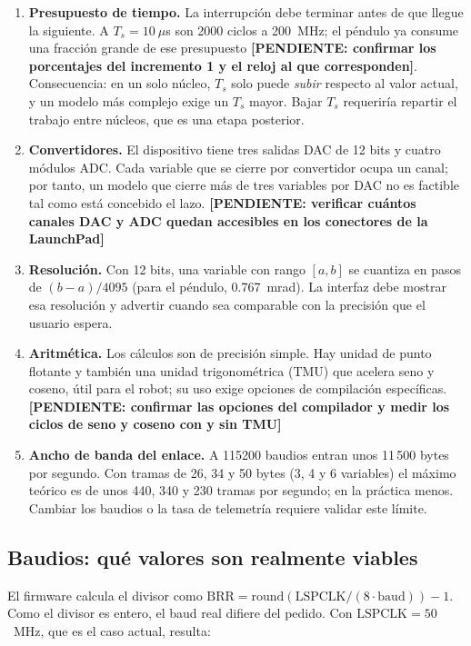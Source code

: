 \documentclass[12pt,letterpaper]{article}
\newcommand{\pendiente}[1]{\textbf{[PENDIENTE: #1]}}
\begin{document}
\begin{enumerate}
    \item \textbf{Presupuesto de tiempo.} La interrupción debe terminar antes de que llegue la siguiente. A $T_s=10~\mu$s son 2000 ciclos a 200~MHz; el péndulo ya consume una fracción grande de ese presupuesto \pendiente{confirmar los porcentajes del incremento 1 y el reloj al que corresponden}. Consecuencia: en un solo núcleo, $T_s$ solo puede \emph{subir} respecto al valor actual, y un modelo más complejo exige un $T_s$ mayor. Bajar $T_s$ requeriría repartir el trabajo entre núcleos, que es una etapa posterior.
    \item \textbf{Convertidores.} El dispositivo tiene tres salidas DAC de 12 bits y cuatro módulos ADC. Cada variable que se cierre por convertidor ocupa un canal; por tanto, un modelo que cierre más de tres variables por DAC no es factible tal como está concebido el lazo. \pendiente{verificar cuántos canales DAC y ADC quedan accesibles en los conectores de la LaunchPad}
    \item \textbf{Resolución.} Con 12 bits, una variable con rango $[a,b]$ se cuantiza en pasos de $(b-a)/4095$ (para el péndulo, 0.767~mrad). La interfaz debe mostrar esa resolución y advertir cuando sea comparable con la precisión que el usuario espera.
    \item \textbf{Aritmética.} Los cálculos son de precisión simple. Hay unidad de punto flotante y también una unidad trigonométrica (TMU) que acelera seno y coseno, útil para el robot; su uso exige opciones de compilación específicas. \pendiente{confirmar las opciones del compilador y medir los ciclos de seno y coseno con y sin TMU}
    \item \textbf{Ancho de banda del enlace.} A 115200 baudios entran unos 11\,500 bytes por segundo. Con tramas de 26, 34 y 50 bytes (3, 4 y 6 variables) el máximo teórico es de unos 440, 340 y 230 tramas por segundo; en la práctica menos. Cambiar los baudios o la tasa de telemetría requiere validar este límite.
\end{enumerate}

\subsection{Baudios: qué valores son realmente viables}

El firmware calcula el divisor como $\mathrm{BRR}=\mathrm{round}(\mathrm{LSPCLK}/(8\cdot\mathrm{baud}))-1$. Como el divisor es entero, el baud real difiere del pedido. Con $\mathrm{LSPCLK}=50$~MHz, que es el caso actual, resulta:
\end{document}
